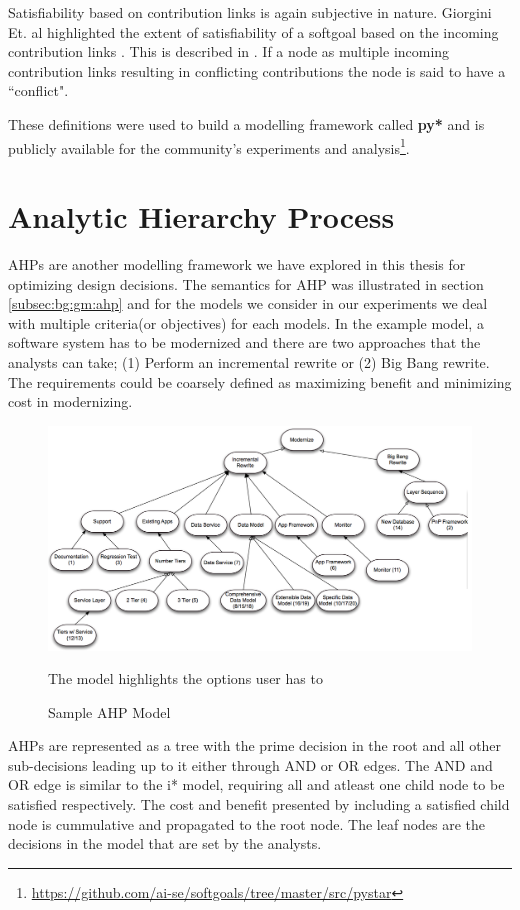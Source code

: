 Satisfiability based on contribution links is again subjective in nature. Giorgini Et. al highlighted the extent of satisfiability of a softgoal based on the incoming contribution links \cite{sebastiani2004}. This is described in . If a node as multiple incoming contribution links resulting in conflicting contributions the node is said to have a ``conflict".

These definitions were used to build a modelling framework called \textbf{py*} and is publicly available for the community's experiments and analysis\footnote{\url{https://github.com/ai-se/softgoals/tree/master/src/pystar}}.

\section{Analytic Hierarchy Process}
\label{sec:model:ahp}

AHPs are another modelling framework we have explored in this thesis for optimizing design decisions. The semantics for AHP was illustrated in section \ref{subsec:bg:gm:ahp} and for the models we consider in our experiments we deal with multiple criteria(or objectives) for each models. In the example model, a software system has to be modernized and there are two approaches that the analysts can take; (1) Perform an incremental rewrite or (2) Big Bang rewrite. The requirements could be coarsely defined as maximizing benefit and minimizing cost in modernizing.

\begin{figure}[hbtp]
    \centering
    \includegraphics[width=\textwidth]{Chapter-3/figs/AHP}
    \caption{Sample AHP Model}
    \medskip
    \small
    The model highlights the options user has to 
    \label{fig:ahp}
\end{figure}

AHPs are represented as a tree with the prime decision in the root and all other sub-decisions leading up to it either through AND or OR edges. The AND and OR edge is similar to the i* model, requiring all and atleast one child node to be satisfied respectively. The cost and benefit presented by including a satisfied child node is cummulative and propagated to the root node. The leaf nodes are the decisions in the model that are set by the analysts.

